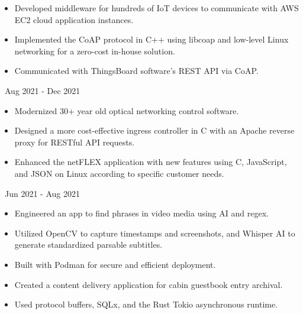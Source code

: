 \documentclass[11pt,letterpaper,ragged2e]{altacv}
\begin{document}
{
	\begin{itemize}
		\item Developed middleware for hundreds of IoT devices to communicate with AWS EC2 cloud application instances.
		\item Implemented the CoAP protocol in C++ using libcoap and low-level Linux networking for a zero-cost in-house solution.
		\item Communicated with ThingsBoard software's REST API via CoAP.
	\end{itemize}
}
{\faCalendar\, Aug 2021 - Dec 2021}
{
}

{
	\begin{itemize}
		\item Modernized 30+ year old optical networking control software.
		\item Designed a more cost-effective ingress controller in C with an Apache reverse proxy for RESTful API requests.
		\item Enhanced the netFLEX application with new features using C, JavaScript, and JSON on Linux according to specific customer needs.
	\end{itemize}
}
{\faCalendar\, Jun 2021 - Aug 2021}
{
}



{
	\begin{itemize}
		\item Engineered an app to find phrases in video media using AI and regex.
		\item Utilized OpenCV to capture timestamps and screenshots, and Whisper AI to generate standardized parsable subtitles.
		\item Built with Podman for secure and efficient deployment.
	\end{itemize}
}
{
}

{
	\begin{itemize}
		\item Created a content delivery application for cabin guestbook entry archival.
		\item Used protocol buffers, SQLx, and the Rust Tokio asynchronous runtime.
	\end{itemize}
}
{
}
\end{document}
